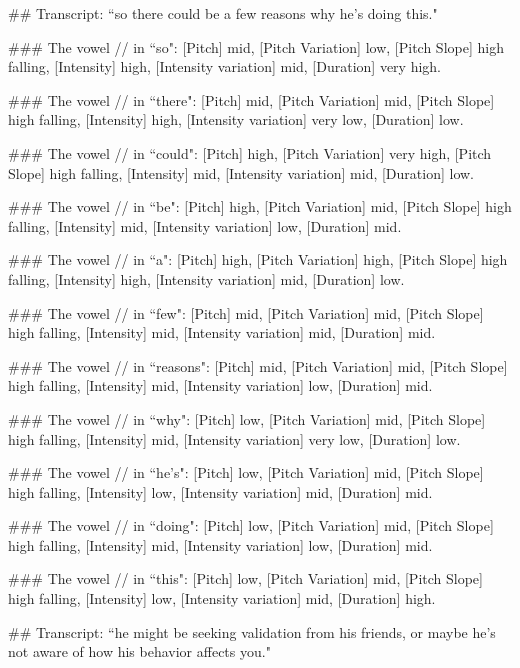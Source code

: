 \begin{tcolorbox}[blue_box, title = {{Example: Vowel-level Acoustic Feature}}]\footnotesize
\#\# Transcript: ``so there could be a few reasons why he's doing this."

\#\#\# The vowel // in ``so": [Pitch] mid, [Pitch Variation] low, [Pitch Slope] high falling, [Intensity] high, [Intensity variation] mid, [Duration] very high.

\#\#\# The vowel // in ``there": [Pitch] mid, [Pitch Variation] mid, [Pitch Slope] high falling, [Intensity] high, [Intensity variation] very low, [Duration] low.

\#\#\# The vowel // in ``could": [Pitch] high, [Pitch Variation] very high, [Pitch Slope] high falling, [Intensity] mid, [Intensity variation] mid, [Duration] low.

\#\#\# The vowel // in ``be": [Pitch] high, [Pitch Variation] mid, [Pitch Slope] high falling, [Intensity] mid, [Intensity variation] low, [Duration] mid.

\#\#\# The vowel // in ``a": [Pitch] high, [Pitch Variation] high, [Pitch Slope] high falling, [Intensity] high, [Intensity variation] mid, [Duration] low.

\#\#\# The vowel // in ``few": [Pitch] mid, [Pitch Variation] mid, [Pitch Slope] high falling, [Intensity] mid, [Intensity variation] mid, [Duration] mid.

\#\#\# The vowel // in ``reasons": [Pitch] mid, [Pitch Variation] mid, [Pitch Slope] high falling, [Intensity] mid, [Intensity variation] low, [Duration] mid.

\#\#\# The vowel // in ``why": [Pitch] low, [Pitch Variation] mid, [Pitch Slope] high falling, [Intensity] mid, [Intensity variation] very low, [Duration] low.

\#\#\# The vowel // in ``he's": [Pitch] low, [Pitch Variation] mid, [Pitch Slope] high falling, [Intensity] low, [Intensity variation] mid, [Duration] mid.

\#\#\# The vowel // in ``doing": [Pitch] low, [Pitch Variation] mid, [Pitch Slope] high falling, [Intensity] mid, [Intensity variation] low, [Duration] mid.

\#\#\# The vowel // in ``this": [Pitch] low, [Pitch Variation] mid, [Pitch Slope] high falling, [Intensity] low, [Intensity variation] mid, [Duration] high.

\#\# Transcript: ``he might be seeking validation from his friends, or maybe he's not aware of how his behavior affects you."


\end{tcolorbox}
